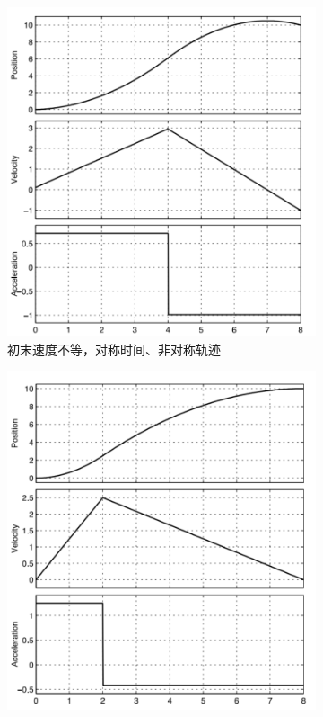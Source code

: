 \documentclass[../main.tex]{subfiles}
\begin{document}
\begin{enumerate}
\begin{enumerate}
\begin{figure}[htbp]
\begin{subfigure}{0.32\textwidth}
                    \includegraphics[width=\linewidth]{images/pwx2.png}
                    \caption{初末速度不等，对称时间、非对称轨迹}
                    \label{fig:pwx2}
                \end{subfigure}
                \begin{subfigure}{0.32\textwidth}
                    \centering
                    \includegraphics[width=\linewidth]{images/pwx3.png}

\end{subfigure}
\end{figure}
\end{enumerate}
\end{enumerate}
\end{document}
